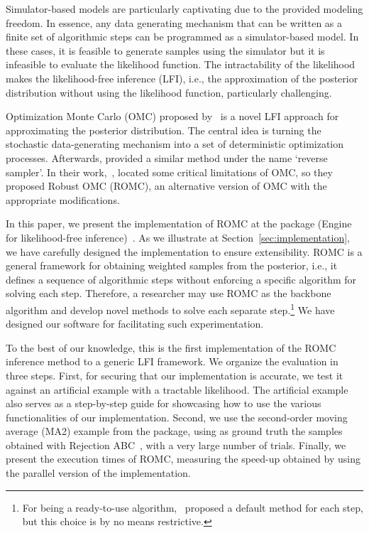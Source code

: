Simulator-based models are particularly captivating due to the
provided modeling freedom. In essence, any data generating mechanism
that can be written as a finite set of algorithmic steps can be
programmed as a simulator-based model. In these cases, it is feasible
to generate samples using the simulator but it is infeasible to
evaluate the likelihood function. The intractability of the likelihood
makes the likelihood-free inference (LFI), i.e., the approximation of
the posterior distribution without using the likelihood function,
particularly challenging.

Optimization Monte Carlo (OMC) proposed by~\citet{Meeds2015} is a
novel LFI approach for approximating the posterior distribution. The
central idea is turning the stochastic data-generating mechanism into
a set of deterministic optimization processes. Afterwards,
\citet{Forneron2016} provided a similar method under the name `reverse
sampler'. In their work,~\citet{Ikonomov2019}, located some critical
limitations of OMC, so they proposed Robust OMC (ROMC), an alternative
version of OMC with the appropriate modifications.

In this paper, we present the implementation of ROMC at the
 package  (Engine for likelihood-free
inference)~\citet{1708.00707}. As we illustrate at
Section~\ref{sec:implementation}, we have carefully designed the
implementation to ensure extensibility. ROMC is a general framework
for obtaining weighted samples from the posterior, i.e., it defines a
sequence of algorithmic steps without enforcing a specific algorithm
for solving each step. Therefore, a researcher may use ROMC as the
backbone algorithm and develop novel methods to solve each separate
step.\footnote{For being a ready-to-use
algorithm,~\citet{Ikonomov2019} proposed a default method for each
step, but this choice is by no means restrictive.} We have designed
our software for facilitating such experimentation.

To the best of our knowledge, this is the first implementation of the
ROMC inference method to a generic LFI framework. We organize the
evaluation in three steps. First, for securing that our implementation
is accurate, we test it against an artificial example with a tractable
likelihood. The artificial example also serves as a step-by-step guide
for showcasing how to use the various functionalities of our
implementation. Second, we use the second-order moving average (MA2)
example from the  package, using as ground truth the samples
obtained with Rejection ABC~\citet{lintusaari2017}, with a very large
number of trials. Finally, we present the execution times of ROMC,
measuring the speed-up obtained by using the parallel version of the
implementation.
